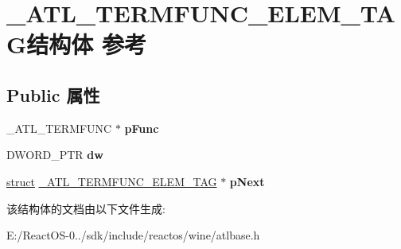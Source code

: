 \hypertarget{struct___a_t_l___t_e_r_m_f_u_n_c___e_l_e_m___t_a_g}{}\section{\+\_\+\+A\+T\+L\+\_\+\+T\+E\+R\+M\+F\+U\+N\+C\+\_\+\+E\+L\+E\+M\+\_\+\+T\+A\+G结构体 参考}
\label{struct___a_t_l___t_e_r_m_f_u_n_c___e_l_e_m___t_a_g}
\subsection*{Public 属性}
\begin{DoxyCompactItemize}
\item 
\mbox{\label{struct___a_t_l___t_e_r_m_f_u_n_c___e_l_e_m___t_a_g_a9f553d594807c9bd49a2a3a42ca4d9bf}} 
\+\_\+\+A\+T\+L\+\_\+\+T\+E\+R\+M\+F\+U\+NC $\ast$ {\bfseries p\+Func}
\item 
\mbox{\label{struct___a_t_l___t_e_r_m_f_u_n_c___e_l_e_m___t_a_g_a83ad01497f0129646054380a1357f14a}} 
D\+W\+O\+R\+D\+\_\+\+P\+TR {\bfseries dw}
\item 
\mbox{\label{struct___a_t_l___t_e_r_m_f_u_n_c___e_l_e_m___t_a_g_a64af34ab4291c00b3dd57476edd94d7b}} 
\hyperlink{interfacestruct}{struct} \hyperlink{struct___a_t_l___t_e_r_m_f_u_n_c___e_l_e_m___t_a_g}{\+\_\+\+A\+T\+L\+\_\+\+T\+E\+R\+M\+F\+U\+N\+C\+\_\+\+E\+L\+E\+M\+\_\+\+T\+AG} $\ast$ {\bfseries p\+Next}
\end{DoxyCompactItemize}


该结构体的文档由以下文件生成\+:\begin{DoxyCompactItemize}
\item 
E\+:/\+React\+O\+S-\/0../sdk/include/reactos/wine/atlbase.\+h\end{DoxyCompactItemize}
